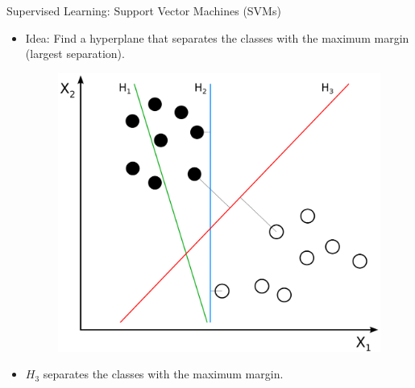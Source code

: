 \documentclass[handout]{beamer}
\begin{document}
\begin{frame}{Supervised Learning: Support Vector Machines (SVMs)}
\begin{scriptsize}

\begin{itemize}


\item Idea: Find a hyperplane that separates the classes with the maximum margin (largest separation). 

     \begin{figure}[h]
        	\includegraphics[scale = 0.15]{pics/SVM.png}
        \end{figure}

\item   
$H_3$ separates the classes with the maximum margin. 

\end{itemize}

   
\end{scriptsize}

\end{frame}
\end{document}
